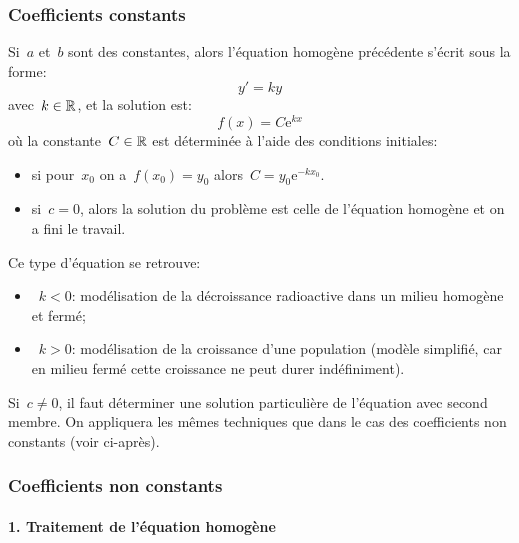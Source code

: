 \medskip
\subsubsection{Coefficients constants} 

Si~$a$ et~$b$ sont des constantes, alors l'équation homogène précédente s'écrit sous la forme:
\begin{equation}
y' = ky
\end{equation}
avec~$k\in\mathbb R$, et la solution est:
\begin{equation}
f(x) = C\mathrm{e}^{kx}
\end{equation}
où la constante~$C\in\mathbb R$ est déterminée à l'aide des conditions initiales:
\begin{itemize}
\item si pour~$x_0$ on a~$f(x_0) = y_0$ alors~$C = y_0\mathrm{e}^{-kx_0}$. 
\item si~$c=0$, alors la solution du problème est celle de l'équation homogène et on a fini le travail.
\end{itemize} 
Ce type d'équation se retrouve: 
\begin{itemize} 
\item~$k<0$: modélisation de la décroissance radioactive dans un milieu homogène et fermé; 
\item~$k>0$: modélisation de la croissance d'une population (modèle simplifié, car en milieu fermé cette croissance ne peut durer indéfiniment). 
\end{itemize} 
Si~$c\ne0$, il faut déterminer une solution particulière de l'équation avec second membre. On appliquera les mêmes techniques que dans le cas des coefficients non constants (voir ci-après). 

\medskip
\subsubsection{Coefficients non constants} 

\paragraph{1. Traitement de l'équation homogène}

